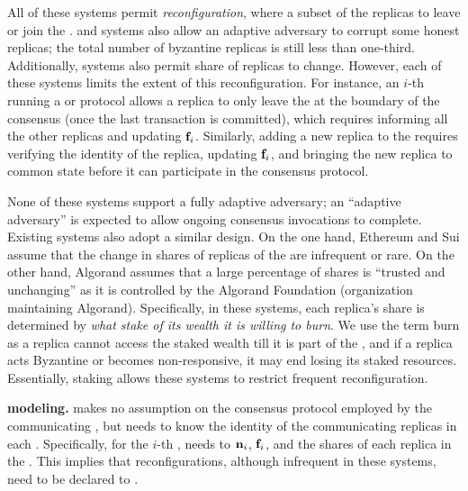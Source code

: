 All of these systems permit {\em reconfiguration}, where a subset of the replicas to leave or join the \RSM{}.
\BFT{} and \PoS{} systems also allow an adaptive adversary to corrupt some honest replicas; 
the total number of byzantine replicas is still less than one-third.
Additionally, \PoS{} systems also permit share of replicas to change.
However, each of these systems limits the extent of this reconfiguration. 
For instance, an $i$-th \RSM{} running a \CFT{} or \BFT{} protocol 
allows a replica to only leave the \RSM{} at the boundary of the consensus 
(once the last transaction is committed), which requires informing all the other replicas and updating $\textbf{f}_{i}$.
Similarly, adding a new replica to the \RSM{} requires verifying the identity 
of the replica, updating $\textbf{f}_{i}$, and bringing the new replica to common state
before it can participate in the consensus protocol.

None of these systems support a fully adaptive adversary; 
an ``adaptive adversary'' is  expected to allow ongoing consensus invocations to complete.
Existing \PoS{} systems also adopt a similar design. 
On the one hand, Ethereum and Sui assume that the change in shares of replicas of the \RSM{} 
are infrequent or rare.
On the other hand, Algorand assumes that a large percentage of shares is ``trusted and unchanging''
as it is controlled by the Algorand Foundation (organization maintaining Algorand).
Specifically, in these \PoS{} systems, each replica's share is determined by {\em what stake of its wealth 
it is willing to burn}.
We use the term burn as a replica cannot access the staked wealth till it is part of the \RSM{}, 
and if a replica acts Byzantine or becomes non-responsive, it may end losing its staked resources.
Essentially, staking allows these \PoS{} systems to restrict frequent reconfiguration.




{\bf \Scrooge{} modeling.}
\Scrooge{} makes no assumption on the consensus protocol employed by the communicating ,
but needs to know the identity of the communicating replicas in each \RSM{}. 
Specifically, for the $i$-th \RSM{}, \Scrooge{} needs to $\textbf{n}_{i}$, $\textbf{f}_{i}$,
and the shares of each replica in the \RSM{}.
This implies that reconfigurations, although infrequent in these systems, 
need to be declared to \Scrooge{}.

